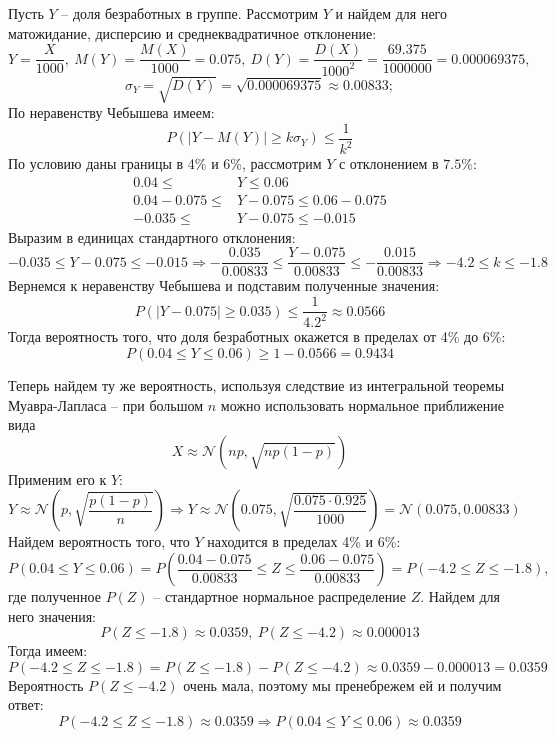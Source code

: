 \documentclass[a4paper, 12pt]{article}
\begin{document}
    Пусть $Y$ -- доля безработных в группе. Рассмотрим $Y$ и найдем для него матожидание, дисперсию и
    среднеквадратичное отклонение:
    $$
    Y=\dfrac{X}{1000},\ M(Y)=\dfrac{M(X)}{1000}=0.075,\ D(Y)=\dfrac{D(X)}{1000^2}=\dfrac{69.375}{1000000}=0.000069375,
    $$
    $$
    \sigma_{Y}=\sqrt{D(Y)}=\sqrt{0.000069375}\approx 0.00833;
    $$
    По неравенству Чебышева имеем:
    $$
    P(|Y-M(Y)|\geq k\sigma_{Y})\leq \dfrac{1}{k^2}
    $$
    По условию даны границы в 4\% и 6\%, рассмотрим $Y$ с отклонением в $7.5\%$:
    \begin{align*}
    0.04\leq& Y\leq 0.06\\
    0.04-0.075\leq& Y-0.075\leq 0.06-0.075\\
    -0.035\leq& Y-0.075\leq -0.015
    \end{align*}
    Выразим в единицах стандартного отклонения:
    $$
    -0.035\leq Y-0.075\leq -0.015\Rightarrow -\dfrac{0.035}{0.00833}\leq \dfrac{Y-0.075}{0.00833}\leq -\dfrac{0.015}{0.00833}\Rightarrow
    -4.2\leq k \leq -1.8
    $$
    Вернемся к неравенству Чебышева и подставим полученные значения:
    $$
    P(|Y-0.075|\geq 0.035)\leq \dfrac{1}{4.2^2}\approx 0.0566
    $$
    Тогда вероятность того, что доля безработных окажется в пределах от 4\% до 6\%:
    $$
    P(0.04\leq Y\leq 0.06)\geq 1-0.0566=0.9434
    $$


    Теперь найдем ту же вероятность, используя следствие из интегральной теоремы\\ Муавра-Лапласа --
    при большом $n$ можно использовать нормальное приближение вида
    $$
    X\approx\mathcal{N}\left(np,\sqrt{np(1-p)}\right)
    $$
    Применим его к $Y$:
    $$
    Y\approx \mathcal{N}\left(p,\sqrt{\dfrac{p(1-p)}{n}}\right)
    \Rightarrow Y\approx \mathcal{N}\left(0.075,\sqrt{\dfrac{0.075\cdot0.925}{1000}}\right)=\mathcal{N}(0.075,0.00833)
    $$
    Найдем вероятность того, что $Y$ находится в пределах 4\% и 6\%:
    $$
    P(0.04\leq Y\leq 0.06)=P\left(\dfrac{0.04-0.075}{0.00833}\leq Z \leq \dfrac{0.06-0.075}{0.00833}\right)
    =P(-4.2\leq Z\leq -1.8),
    $$
    где полученное $P(Z)$ -- стандартное нормальное распределение $Z$.
    Найдем для него значения:
    $$
    P(Z\leq -1.8)\approx 0.0359,\ P(Z\leq -4.2)\approx 0.000013
    $$
    Тогда имеем:
    $$
    P(-4.2 \leq Z \leq -1.8) = P(Z \leq -1.8) - P(Z \leq -4.2) \approx 0.0359 - 0.000013 = 0.0359
    $$
    Вероятность $P(Z\leq -4.2)$ очень мала, поэтому мы пренебрежем ей и получим
    ответ:
    $$
    P(-4.2\leq Z \leq -1.8)\approx0.0359\Rightarrow P(0.04\leq Y \leq 0.06)\approx0.0359
    $$
\end{document}
